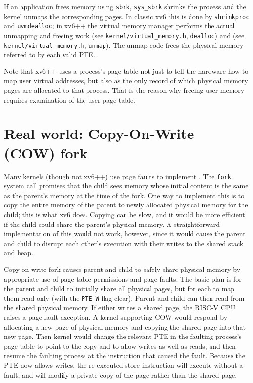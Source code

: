 If an application frees memory using {\tt sbrk}, \lstinline{sys_sbrk}
shrinks the process and the kernel unmaps the corresponding pages. In classic xv6
this is done by \lstinline{shrinkproc} and \lstinline{uvmdealloc}; in xv6++ the
virtual memory manager performs the actual unmapping and freeing work
(see \texttt{kernel/virtual\_memory.h}, \texttt{dealloc}) and (see
\texttt{kernel/virtual\_memory.h}, \texttt{unmap}).
The unmap code frees the physical memory referred to by each valid PTE.

Note that xv6++ uses a process's page table not just to tell the
hardware how to map user virtual addresses, but also as the only
record of which physical memory pages are allocated to that
process. That is the reason why freeing user memory requires
examination of the user page table.

\section{Real world: Copy-On-Write (COW) fork}

Many kernels (though not xv6++) use page faults to implement
. The {\tt fork} system call
promises that the
child sees memory whose initial content is the same as the parent's
memory at the time of the fork. One way to implement this is to copy
the entire memory of the parent to newly allocated physical memory for
the child; this is what xv6 does. Copying can be slow, and it
would be more efficient if the child could share the parent's physical
memory. A straightforward implementation of this would not work,
however, since it would cause the parent and child to disrupt each
other's execution with their writes to the shared stack and heap.

Copy-on-write fork causes parent and child to safely share physical
memory by appropriate use of page-table permissions and page faults.
The basic plan is for the parent and child to initially share all
physical pages, but for each to map them read-only (with the
\lstinline{PTE_W} flag clear). Parent and child can then read from the
shared physical memory. If either writes a shared page, the RISC-V CPU
raises a page-fault exception. A kernel supporting COW would respond
by allocating a new page of physical memory and copying the shared
page into that new page. Then kernel would change the relevant PTE in
the faulting process's page table to point to the copy and to allow
writes as well as reads, and then resume the faulting process at the
instruction that caused the fault. Because the PTE now allows writes,
the re-executed store instruction will execute without a fault, and
will modify a private copy of the page rather than the shared page.

